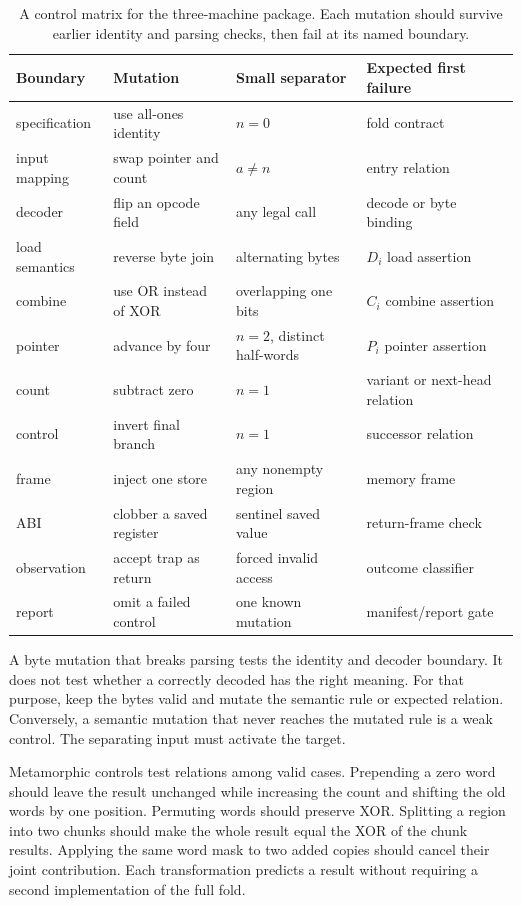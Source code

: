 \begin{table}[htbp]
\centering
\caption{A control matrix for the three-machine package. Each mutation should
survive earlier identity and parsing checks, then fail at its named boundary.}
\begin{tabular}{@{}p{}p{}p{}p{}@{}}
\toprule
Boundary & Mutation & Small separator & Expected first failure \\
\midrule
specification & use all-ones identity & \(n=0\) & fold contract \\
input mapping & swap pointer and count & \(a\ne n\) & entry relation \\
decoder & flip an opcode field & any legal call & decode or byte binding \\
load semantics & reverse byte join & alternating bytes & \(D_i\) load assertion \\
combine & use OR instead of XOR & overlapping one bits & \(C_i\) combine assertion \\
pointer & advance by four & \(n=2\), distinct half-words & \(P_i\) pointer assertion \\
count & subtract zero & \(n=1\) & variant or next-head relation \\
control & invert final branch & \(n=1\) & successor relation \\
frame & inject one store & any nonempty region & memory frame \\
ABI & clobber a saved register & sentinel saved value & return-frame check \\
observation & accept trap as return & forced invalid access & outcome classifier \\
report & omit a failed control & one known mutation & manifest/report gate \\
\bottomrule
\end{tabular}
\label{tab:xor-control-matrix}
\end{table}

A byte mutation that breaks parsing tests the identity and decoder boundary.
It does not test whether a correctly decoded  has the right meaning.
For that purpose, keep the bytes valid and mutate the semantic rule or expected
relation. Conversely, a semantic mutation that never reaches the mutated rule
is a weak control. The separating input must activate the target.

Metamorphic controls test relations among valid cases. Prepending a zero word
should leave the result unchanged while increasing the count and shifting the
old words by one position. Permuting words should preserve XOR. Splitting a
region into two chunks should make the whole result equal the XOR of the chunk
results. Applying the same word mask to two added copies should cancel their
joint contribution. Each transformation predicts a result without requiring
a second implementation of the full fold.

